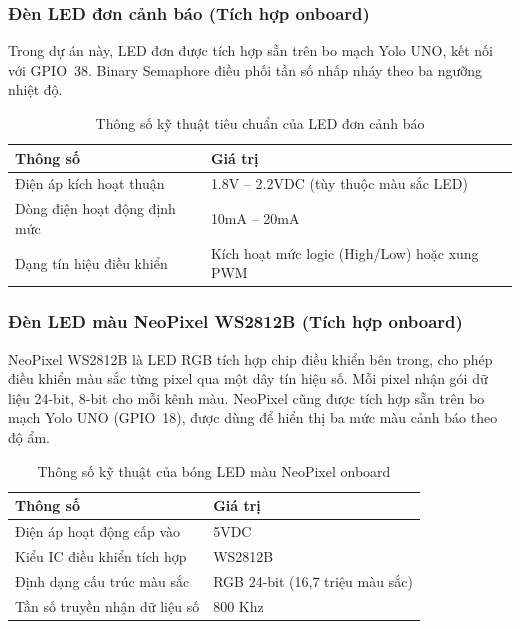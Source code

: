 \subsubsection{Đèn LED đơn cảnh báo (Tích hợp onboard)}
Trong dự án này, LED đơn được tích hợp sẵn trên bo mạch Yolo UNO, kết nối với GPIO~38. Binary Semaphore điều phối tần số nhấp nháy theo ba ngưỡng nhiệt độ.

\begin{table}[H]
    \centering
    \caption{Thông số kỹ thuật tiêu chuẩn của LED đơn cảnh báo}
    \begin{tabular}{|l|l|}
    \hline
    \textbf{Thông số} & \textbf{Giá trị} \\ \hline
    Điện áp kích hoạt thuận & 1.8V -- 2.2VDC (tùy thuộc màu sắc LED) \\ \hline
    Dòng điện hoạt động định mức & 10mA -- 20mA \\ \hline
    Dạng tín hiệu điều khiển & Kích hoạt mức logic (High/Low) hoặc xung PWM \\ \hline
    \end{tabular}
\end{table}

\subsubsection{Đèn LED màu NeoPixel WS2812B (Tích hợp onboard)}
NeoPixel WS2812B là LED RGB tích hợp chip điều khiển bên trong, cho phép điều khiển màu sắc từng pixel qua một dây tín hiệu số. Mỗi pixel nhận gói dữ liệu 24-bit, 8-bit cho mỗi kênh màu. NeoPixel cũng được tích hợp sẵn trên bo mạch Yolo UNO (GPIO~18), được dùng để hiển thị ba mức màu cảnh báo theo độ ẩm.

\begin{table}[H]
    \centering
    \caption{Thông số kỹ thuật của bóng LED màu NeoPixel onboard}
    \begin{tabular}{|l|l|}
    \hline
    \textbf{Thông số} & \textbf{Giá trị} \\ \hline
    Điện áp hoạt động cấp vào & 5VDC \\ \hline
    Kiểu IC điều khiển tích hợp & WS2812B \\ \hline
    Định dạng cấu trúc màu sắc & RGB 24-bit (16,7 triệu màu sắc) \\ \hline
    Tần số truyền nhận dữ liệu số & 800 Khz \\ \hline
    \end{tabular}
\end{table}

